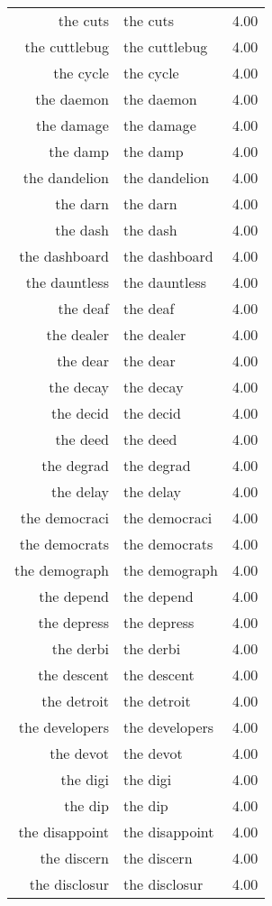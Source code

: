 \begin{table}[ht]
\begin{tabular}{rlr}
  the cuts & the cuts & 4.00 \\ 
  the cuttlebug & the cuttlebug & 4.00 \\ 
  the cycle & the cycle & 4.00 \\ 
  the daemon & the daemon & 4.00 \\ 
  the damage & the damage & 4.00 \\ 
  the damp & the damp & 4.00 \\ 
  the dandelion & the dandelion & 4.00 \\ 
  the darn & the darn & 4.00 \\ 
  the dash & the dash & 4.00 \\ 
  the dashboard & the dashboard & 4.00 \\ 
  the dauntless & the dauntless & 4.00 \\ 
  the deaf & the deaf & 4.00 \\ 
  the dealer & the dealer & 4.00 \\ 
  the dear & the dear & 4.00 \\ 
  the decay & the decay & 4.00 \\ 
  the decid & the decid & 4.00 \\ 
  the deed & the deed & 4.00 \\ 
  the degrad & the degrad & 4.00 \\ 
  the delay & the delay & 4.00 \\ 
  the democraci & the democraci & 4.00 \\ 
  the democrats & the democrats & 4.00 \\ 
  the demograph & the demograph & 4.00 \\ 
  the depend & the depend & 4.00 \\ 
  the depress & the depress & 4.00 \\ 
  the derbi & the derbi & 4.00 \\ 
  the descent & the descent & 4.00 \\ 
  the detroit & the detroit & 4.00 \\ 
  the developers & the developers & 4.00 \\ 
  the devot & the devot & 4.00 \\ 
  the digi & the digi & 4.00 \\ 
  the dip & the dip & 4.00 \\ 
  the disappoint & the disappoint & 4.00 \\ 
  the discern & the discern & 4.00 \\ 
  the disclosur & the disclosur & 4.00 \\ 

\end{tabular}
\end{table}
